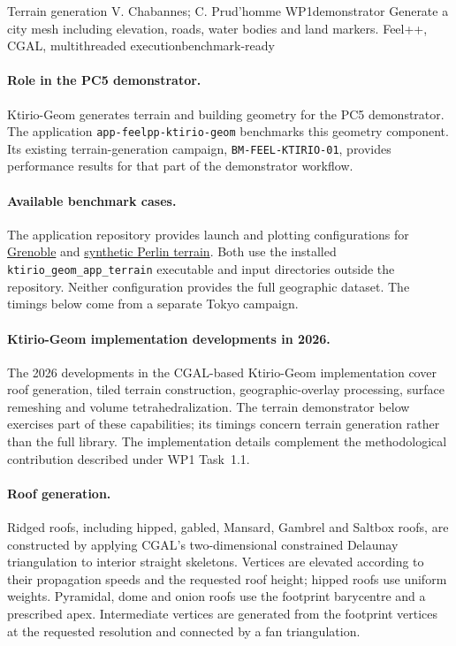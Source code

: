 {Terrain generation}
{V. Chabannes; C. Prud'homme}
{WP1}{demonstrator}
{Generate a city mesh including elevation, roads, water bodies and land markers.}
{Feel++, CGAL, multithreaded execution}{benchmark-ready}

\paragraph{Role in the PC5 demonstrator.}
Ktirio-Geom generates terrain and building geometry for the PC5
\KtirioUrbanBuildingContext{} demonstrator.
The application \texttt{app-feelpp-ktirio-geom} benchmarks this geometry
component. Its existing terrain-generation campaign,
\texttt{BM-FEEL-KTIRIO-01}, provides performance results for that part of
the demonstrator workflow.

\paragraph{Available benchmark cases.}
The application repository provides launch and plotting configurations for
\href{https://github.com/numpex/apps-feelpp/blob/main/src/ktirio-geom/terrain/grenoble/grenoble.json}{Grenoble}
and \href{https://github.com/numpex/apps-feelpp/blob/main/src/ktirio-geom/terrain/perlin/perlin.json}{synthetic Perlin terrain}.
Both use the installed \nolinkurl{ktirio_geom_app_terrain} executable and
input directories outside the repository. Neither configuration provides
the full geographic dataset. The timings below come from a separate Tokyo campaign.

\paragraph{Ktirio-Geom implementation developments in 2026.}
\label{sec:app:ktirio-geom:implementation-2026}

The 2026 developments in the CGAL-based Ktirio-Geom implementation cover
roof generation, tiled terrain construction, geographic-overlay processing,
surface remeshing and volume tetrahedralization. The terrain demonstrator
below exercises part of these capabilities; its timings concern terrain
generation rather than the full library. The implementation details complement
the methodological contribution described under WP1 Task~1.1.

\paragraph{Roof generation.}
Ridged roofs, including hipped, gabled, Mansard, Gambrel and Saltbox roofs,
are constructed by applying CGAL's two-dimensional constrained Delaunay
triangulation to interior straight skeletons. Vertices are elevated according
to their propagation speeds and the requested roof height; hipped roofs use
uniform weights. Pyramidal, dome and onion roofs use the footprint barycentre
and a prescribed apex. Intermediate vertices are generated from the footprint
vertices at the requested resolution and connected by a fan triangulation.

